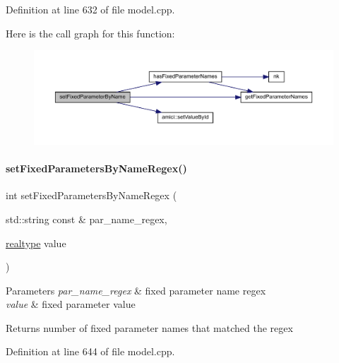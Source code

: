 Definition at line 632 of file model.\+cpp.

Here is the call graph for this function\+:
\nopagebreak
\begin{figure}[H]
\begin{center}
\leavevmode
\includegraphics[width=350pt]{classamici_1_1_model_af1225439bd6deceb98b224e75a960800_cgraph}
\end{center}
\end{figure}
\mbox{\label{classamici_1_1_model_a4802f7d56264e3b592c167da8166cb73}} 
\paragraph{\texorpdfstring{setFixedParametersByNameRegex()}{setFixedParametersByNameRegex()}}
{\footnotesize\ttfamily int set\+Fixed\+Parameters\+By\+Name\+Regex (\begin{DoxyParamCaption}\item[{std\+::string const \&}]{par\+\_\+name\+\_\+regex,  }\item[{\mbox{\hyperlink{namespaceamici_a1bdce28051d6a53868f7ccbf5f2c14a3}{realtype}}}]{value }\end{DoxyParamCaption})}


\begin{DoxyParams}{Parameters}
{\em par\+\_\+name\+\_\+regex} & fixed parameter name regex \\
\hline
{\em value} & fixed parameter value \\
\hline
\end{DoxyParams}
\begin{DoxyReturn}{Returns}
number of fixed parameter names that matched the regex 
\end{DoxyReturn}


Definition at line 644 of file model.\+cpp.

